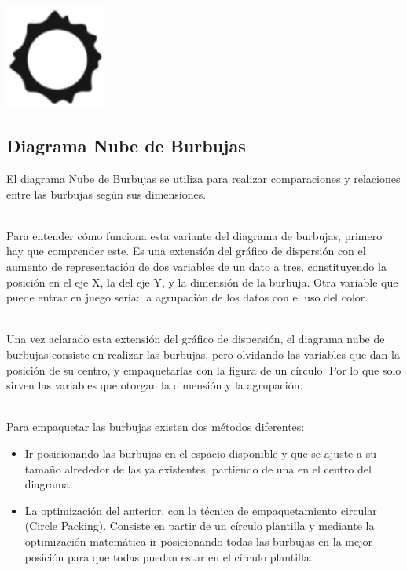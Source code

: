 \documentclass{article}\usepackage[]{graphicx}\usepackage[]{color}
\begin{document}
~\\~\\~\\~\\
\vbox{
    \centering
    \includegraphics[width=0.25\textwidth]{imag/flow}
}
\clearpage
\subsection{Diagrama Nube de Burbujas}
El diagrama Nube de Burbujas se utiliza para realizar comparaciones y relaciones entre las burbujas seg\'un sus dimensiones.~\\~\par
Para entender c\'omo funciona esta variante del diagrama de burbujas, primero hay que comprender este.  Es una extensi\'on del gr\'afico de dispersi\'on con el aumento de representaci\'on de dos variables de un dato a tres, constituyendo la posici\'on en el eje X, la del eje Y, y la dimensi\'on de la burbuja.  Otra variable que puede entrar en juego ser\'ia: la agrupaci\'on de los datos con el uso del color.~\\~\par
Una vez aclarado esta extensi\'on del gr\'afico de dispersi\'on, el diagrama nube de burbujas consiste en realizar las burbujas, pero olvidando las variables que dan la posici\'on de su centro, y empaquetarlas con la figura de un c\'irculo. Por lo que solo sirven las variables que otorgan la dimensi\'on y la agrupaci\'on\cite{disp-bubble}.~\\~\par
Para empaquetar las burbujas existen dos m\'etodos diferentes:
\begin{itemize}
\item Ir posicionando las burbujas en el espacio disponible y que se ajuste a su tama\~no alrededor de las ya existentes, partiendo de una en el centro del diagrama.
\item La optimizaci\'on del anterior, con la t\'ecnica de empaquetamiento circular (Circle Packing). Consiste en partir de un c\'irculo plantilla y mediante la optimizaci\'on matem\'atica ir posicionando todas las burbujas en la mejor posici\'on para que todas puedan estar en el c\'irculo plantilla\cite{pack-book}.
\end{itemize}
\end{document}
